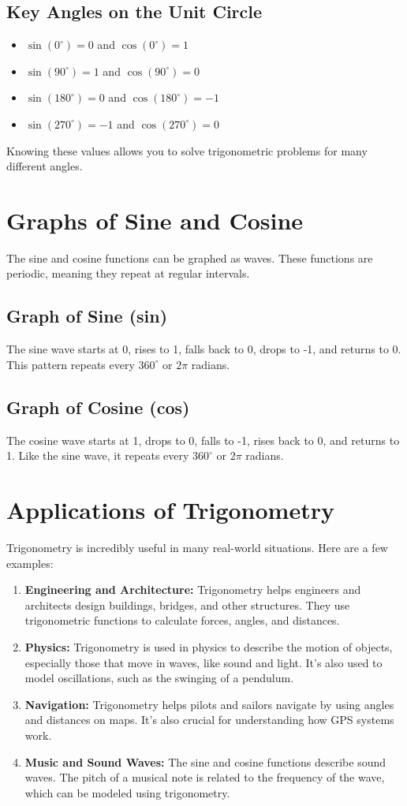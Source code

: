 \subsection{Key Angles on the Unit Circle}
\begin{itemize}
    \item $\sin(0^\circ) = 0$ and $\cos(0^\circ) = 1$
    \item $\sin(90^\circ) = 1$ and $\cos(90^\circ) = 0$
    \item $\sin(180^\circ) = 0$ and $\cos(180^\circ) = -1$
    \item $\sin(270^\circ) = -1$ and $\cos(270^\circ) = 0$
\end{itemize}
Knowing these values allows you to solve trigonometric problems for many different angles.

\section{Graphs of Sine and Cosine}
The sine and cosine functions can be graphed as waves. These functions are periodic, meaning they repeat at regular intervals.

\subsection{Graph of Sine (sin)}
The sine wave starts at 0, rises to 1, falls back to 0, drops to -1, and returns to 0. This pattern repeats every $360^\circ$ or $2\pi$ radians.

\subsection{Graph of Cosine (cos)}
The cosine wave starts at 1, drops to 0, falls to -1, rises back to 0, and returns to 1. Like the sine wave, it repeats every $360^\circ$ or $2\pi$ radians.

\section{Applications of Trigonometry}
Trigonometry is incredibly useful in many real-world situations. Here are a few examples:
\begin{enumerate}
    \item \textbf{Engineering and Architecture:} Trigonometry helps engineers and architects design buildings, bridges, and other structures. They use trigonometric functions to calculate forces, angles, and distances.
    \item \textbf{Physics:} Trigonometry is used in physics to describe the motion of objects, especially those that move in waves, like sound and light. It’s also used to model oscillations, such as the swinging of a pendulum.
    \item \textbf{Navigation:} Trigonometry helps pilots and sailors navigate by using angles and distances on maps. It’s also crucial for understanding how GPS systems work.
    \item \textbf{Music and Sound Waves:} The sine and cosine functions describe sound waves. The pitch of a musical note is related to the frequency of the wave, which can be modeled using trigonometry.
\end{enumerate}

